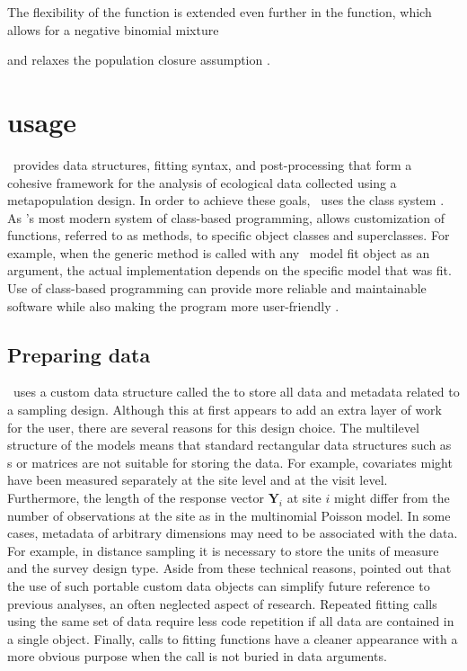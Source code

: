\documentclass[article,shortnames]{jss}
\newcommand{\um}{\pkg{unmarked}}
\newcommand{\rlang}{\proglang{R}}
\begin{document}
The flexibility of the  function is extended even
further in the  function, which allows for a negative binomial
mixture {\citep{DorazioEA05} and relaxes the population closure assumption
\citep{chandlerEAip_TempEm}.

\section[unmarked usage]{ usage}
\label{sec:unmarked-usage}

\um\ provides data structures, fitting syntax, and post-processing that form a
cohesive framework for the analysis of ecological data collected using
a metapopulation design. In order to achieve these goals, \um\ uses the 
class system \citep{Chambers2008}. As \rlang's most modern system of class-based
programming,  allows customization of functions, referred to as
methods, to specific object classes and superclasses. For example,
when the generic  method is called with any \um\ model
fit object as an argument, the actual  implementation
depends on the specific model that was fit.  Use of class-based
programming can provide more reliable and maintainable software while
also making the program more user-friendly \citep{Chambers2008}.


\subsection{Preparing data}
\label{sec:data-requirements}

\um\ uses a custom  data structure called the 
to store all data and metadata related to a sampling design.  Although this at
first appears to add an extra layer of work for the user, there are
several reasons for this design choice.  The multilevel structure of
the models means that standard rectangular data structures such as
s or matrices are not suitable for storing the data.  For
example, covariates might have been measured separately at the site
level and at the visit level.  Furthermore, the length of the response
vector $\mathbf Y_{i}$ at site $i$ might differ from the number of
observations at the site as in the multinomial Poisson model.  In some
cases, metadata of arbitrary dimensions may need to be associated with the
data.  For example, in distance sampling it is necessary to store the units
of measure and the survey design type.  Aside
from these technical reasons, \citet{Gentleman2009} pointed out that
the use of such portable custom data objects can simplify future
reference to previous analyses, an often neglected aspect of research.
Repeated fitting calls using the same set of data require less code
repetition if all data are contained in a single object.  Finally,
calls to fitting functions have a cleaner appearance with a more
obvious purpose when the call is not buried in data arguments.

}
\end{document}
